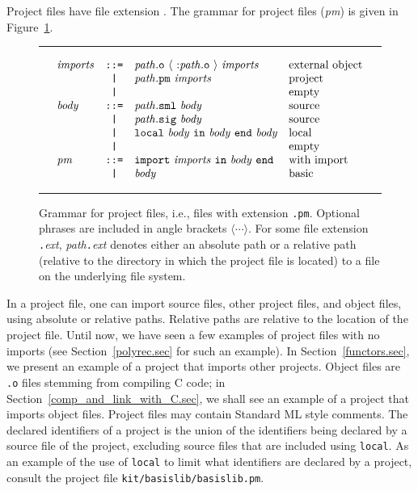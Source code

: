 \documentclass[12pt]{book}
\begin{document}
Project files have file extension . The 
%
grammar for project files ({\it pm}) is given in Figure~\ref{pm_grammar.fig}.
\begin{figure}
\hrule\medskip
$$\begin{array}{lcll}
  {\it imports} & \verb+::=+ & {\it path}{\tt .o} ~\langle~{\tt :} {\it path}{\tt .o}~\rangle ~ 
                                  {\it imports} & \mbox{external object} \\
                & \verb+|+   & {\it path}{\tt .pm} ~ {\it imports} & \mbox{project} \\
                & \verb+|+   & & \mbox{empty} \\
  {\it body}  & \verb+::=+ & {\it path}{\tt .sml} ~{\it body} & \mbox{source} \\
                & \verb+|+   & {\it path}{\tt .sig} ~{\it body} & \mbox{source} \\
                & \verb+|+   & {\tt local}~{\it body}~{\tt in}~{\it body}~{\tt end}~{\it body} & \mbox{local} \\
                & \verb+|+   & & \mbox{empty} \\
  {\it pm}      & \verb+::=+ & {\tt import} ~{\it imports}~ {\tt in} ~ {\it body}~ {\tt end} & \mbox{with import} \\
                & \verb+|+   & {\it body} & \mbox{basic} 
  \end{array}$$
\caption{Grammar for project files, i.e., files with extension {\tt .pm}. 
  Optional phrases are included in angle brackets
  $\langle\cdots\rangle$. For some file extension {\tt .}{\it ext}, {\it
    path}{\tt .}{\it ext\/} denotes either an absolute path or a relative path
  (relative to the directory in which the project file is located) to
  a file on the underlying file system.}
\label{pm_grammar.fig}
\medskip \hrule
\end{figure}
In a project file, one can import source files, other project files,
and object files, using absolute or relative
paths.  Relative paths are
relative to the location of the project file.  Until now, we have seen
a few examples of project files with no imports (see
Section~\ref{polyrec.sec} for such an example). In
Section~\ref{functors.sec}, we present an example of a project that
imports other projects. Object files are {\tt .o} files stemming from
compiling C code; in Section~\ref{comp_and_link_with_C.sec}, we shall
see an example of a project that imports object files. Project files
may contain Standard ML style
%
%
comments. The declared identifiers of a project is the union of the
identifiers being declared by a source file of the project, excluding
source files that are included using {\tt local}. As an example of
the use of {\tt local} to limit what identifiers are declared by a
project, consult the project file {\tt kit/basislib/basislib.pm}.
\end{document}
